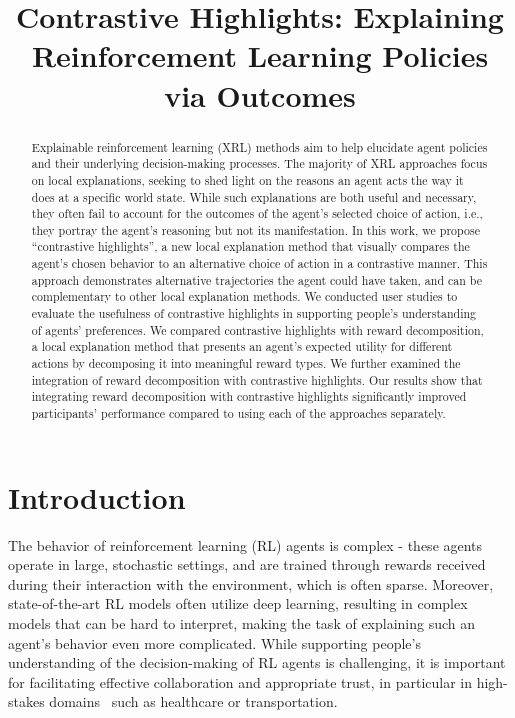 \documentclass{ecai}
\begin{document}
\begin{frontmatter}

\title{Contrastive Highlights: Explaining Reinforcement Learning Policies via Outcomes}



\begin{abstract}
Explainable reinforcement learning (XRL) methods aim to help elucidate agent policies and their underlying decision-making processes. The majority of XRL approaches focus on local explanations, seeking to shed light on the reasons an agent acts the way it does at a specific world state. While such explanations are both useful and necessary, they often fail to account for the outcomes of the agent's selected choice of action, i.e., they portray the agent's reasoning but not its manifestation. 
In this work, we propose ``contrastive highlights'', a new local explanation method that visually compares the agent's chosen behavior to an alternative choice of action in a contrastive manner. This approach demonstrates alternative trajectories the agent could have taken, and can be complementary to other local explanation methods. 
We conducted user studies to evaluate the usefulness of contrastive highlights in supporting people's understanding of agents' preferences. We compared contrastive highlights with reward decomposition,  a local explanation method that presents an agent's expected utility for different actions by decomposing it into meaningful reward types. We further examined the integration of reward decomposition with contrastive highlights.
Our results show that integrating reward decomposition with contrastive highlights significantly improved participants' performance compared to using each of the approaches separately.
\end{abstract}

\end{frontmatter}

\section{Introduction}
The behavior of reinforcement learning (RL) agents is complex - these agents operate in large, stochastic settings, and are trained through rewards received during their interaction with the environment, which is often sparse. Moreover, state-of-the-art RL models often utilize deep learning, resulting in complex models that can be hard to interpret, making the task of explaining such an agent's behavior even more complicated. While supporting people's understanding of the decision-making of RL agents is challenging, it is important for facilitating effective collaboration and appropriate trust, in particular in high-stakes domains~\cite{2210.11584} such as healthcare or transportation. 
\end{document}
